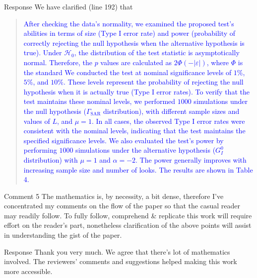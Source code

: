 \documentclass[11pt]{report}
\begin{document}
\begin{responsebox}{Response}
We have clarified (line 192) that
\begin{quote}
	\textcolor{blue}{
		After checking the data's normality, we examined the proposed test's abilities in terms of size (Type I error rate) and power (probability of correctly rejecting the null hypothesis when the alternative hypothesis is true).
Under \(\mathcal{H}_0\), the distribution of the test statistic is asymptotically normal.
Therefore, the \(p\) values are calculated as
\(2\Phi(-|\varepsilon|)\), where \(\Phi\) is the standard
We conducted the test at nominal significance levels of $1\%$, $5\%$, and $10\%$. 
These levels represent the probability of rejecting the null hypothesis when it is actually true (Type I error rates). 
To verify that the test maintains these nominal levels, we performed $1000$ simulations under the null hypothesis ($\Gamma_{\text{SAR}}$ distribution), with different sample sizes and values of $L$, and $\mu=1$. In all cases, the observed Type I error rates were consistent with the nominal levels, indicating that the test maintains the specified significance levels.
We also evaluated the test's power by performing $1000$ simulations under the alternative hypothesis ($G_I^0$ distribution) with $\mu=1$ and $\alpha=-2$.
The power generally improves with increasing sample size and number of looks.
The results are shown in Table 4.
}
\end{quote}

\end{responsebox}

\begin{reviewbox}{Comment 5}
The mathematics is, by necessity, a bit dense, therefore I've concentrated my comments on the flow of the paper so that the casual reader may readily follow. To fully follow, comprehend \& replicate this work will require effort on the reader's part, nonetheless clarification of the above points will assist in understanding the gist of the paper. 
\end{reviewbox}

\begin{responsebox}{Response}
Thank you very much.
We agree that there's lot of mathematics involved.
The reviewers' comments and suggestions helped making this work more accessible.
\end{responsebox}



\end{document}

